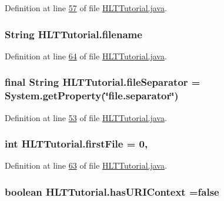 Definition at line \hyperlink{L57}{57} of file \hyperlink{}{H\-L\-T\-Tutorial.\-java}.

\hypertarget{class_h_l_t_tutorial_ab4c914d0fd25e0dfcb7fdeb677b26211}{
\subsubsection[{filename}]{\setlength{\rightskip}{0pt plus 5cm}String H\-L\-T\-Tutorial.\-filename\hspace{0.3cm}{\ttfamily [static]}}}\label{class_h_l_t_tutorial_ab4c914d0fd25e0dfcb7fdeb677b26211}


Definition at line \hyperlink{L64}{64} of file \hyperlink{}{H\-L\-T\-Tutorial.\-java}.

\hypertarget{class_h_l_t_tutorial_ac4f6995f0d67d0bfdd60d26dd7703db5}{
\subsubsection[{file\-Separator}]{\setlength{\rightskip}{0pt plus 5cm}final String H\-L\-T\-Tutorial.\-file\-Separator = System.\-get\-Property(\char`\"{}file.\-separator\char`\"{})\hspace{0.3cm}{\ttfamily [private]}}}\label{class_h_l_t_tutorial_ac4f6995f0d67d0bfdd60d26dd7703db5}


Definition at line \hyperlink{L53}{53} of file \hyperlink{}{H\-L\-T\-Tutorial.\-java}.

\hypertarget{class_h_l_t_tutorial_aeca9a1b824beab58de7f27e639b6fc52}{
\subsubsection[{first\-File}]{\setlength{\rightskip}{0pt plus 5cm}int H\-L\-T\-Tutorial.\-first\-File = 0\hspace{0.3cm}{\ttfamily [static]}, {\ttfamily [private]}}}\label{class_h_l_t_tutorial_aeca9a1b824beab58de7f27e639b6fc52}


Definition at line \hyperlink{L63}{63} of file \hyperlink{}{H\-L\-T\-Tutorial.\-java}.

\hypertarget{class_h_l_t_tutorial_a25e52e2c4a0580906443617dd11e5050}{
\subsubsection[{has\-U\-R\-I\-Context}]{\setlength{\rightskip}{0pt plus 5cm}boolean H\-L\-T\-Tutorial.\-has\-U\-R\-I\-Context =false\hspace{0.3cm}{\ttfamily [static]}}}\label{class_h_l_t_tutorial_a25e52e2c4a0580906443617dd11e5050}


